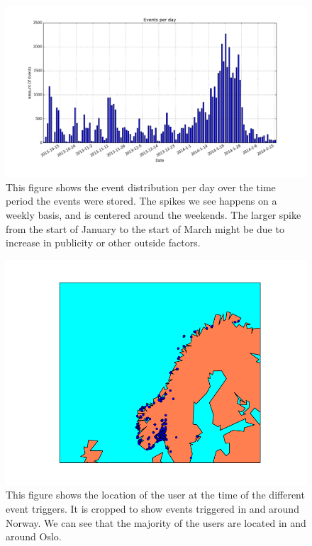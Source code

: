     \begin{figure}[H]
        \includegraphics[width=5in]{image/eventsPerDay.png}
        \centering
        \caption[Distribution of events per day]{This figure shows the event distribution per day over the time period the events were stored.
        The spikes we see happens on a weekly basis, and is centered around the weekends.
        The larger spike from the start of January to the start of March might be due to increase in publicity or other outside factors.}
    \end{figure}

    \begin{figure}[H]
        \includegraphics[width=5in]{image/simpleGeoPlot.png}
        \centering
        \caption[Simple plotting of event location]{This figure shows the location of the user at the time of the different event triggers.
        It is cropped to show events triggered in and around Norway.
        We can see that the majority of the users are located in and around Oslo.}
        \label{figure:croppedGeoplot}
    \end{figure}

